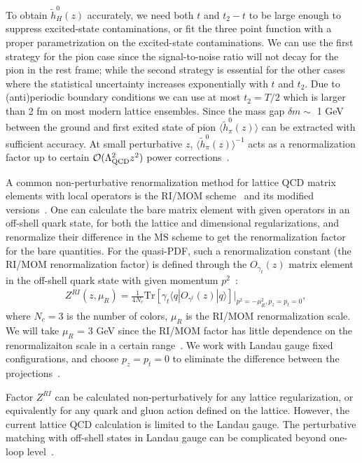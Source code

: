 To obtain $\tilde{h}^0_{H}(z)$ accurately, we need both $t$ and $t_2-t$ to be large enough to suppress excited-state contaminations, or fit the three point function with a proper parametrization on the excited-state contaminations. We can use the first strategy for the pion case since the signal-to-noise ratio will not decay for the pion in the rest frame; while the second strategy is essential for the other cases where the statistical uncertainty increases exponentially with $t$ and $t_2$. Due to (anti)periodic boundary conditions we can use at most $t_2=T/2$ which is larger than 2 fm on most modern lattice ensembles. Since the mass gap $\delta m\sim $ 1 GeV between the ground and first exited state of pion  $\langle \tilde{h}^0_{\pi}(z)\rangle$ can be extracted with sufficient  accuracy. At small perturbative $z$, $\langle \tilde{h}^0_{\pi}(z)\rangle^{-1}$ acts as a renormalization factor up to certain ${\cal O}(\Lambda_{\rm QCD}^2z^2)$ power corrections~\cite{Orginos:2017kos}.

A common non-perturbative renormalization method for lattice QCD matrix elements with local operators is the RI/MOM scheme~\cite{Martinelli:1994ty} and its modified versions~\cite{Aoki:2007xm}. One can calculate the bare matrix element with given operators in an off-shell quark state, for both the lattice and dimensional regularizations, and renormalize their difference in the $\overline{\textrm{MS}}$ scheme to get the renormalization factor for the bare quantities. For the quasi-PDF, such a renormalization constant (the RI/MOM renormalization factor) is defined through the $O_{\gamma_t}(z)$ matrix element in the off-shell quark state with given momentum $p^2$~\cite{Green:2017xeu,Chen:2017mzz,Alexandrou:2017huk,Stewart:2017tvs}:
\begin{align}\label{eq:Z_ri}
&Z^{RI}(z,\mu_R)=\frac{1}{4N_c}\textrm{Tr}[\gamma_t\langle q|O_{\gamma^t}(z)|q\rangle]|_{p^2=-\mu_R^2,p_z=p_t=0},
\end{align}
where $N_c=3$ is the number of colors, $\mu_R$ is the RI/MOM renormalization scale. We will take $\mu_R$ = 3 GeV since the RI/MOM factor has little dependence on the renormalizaiton scale in a certain range~\cite{Zhang:2020rsx}. We work with Landau gauge fixed configurations, and choose $p_z=p_t=0$ to eliminate the difference between the projections~\cite{Liu:2018uuj}. 

Factor $Z^{RI}$ can be calculated non-perturbatively for any lattice regularization, or equivalently for any quark and gluon action defined on the lattice. However, the current lattice QCD calculation is limited to the Landau gauge. The perturbative matching with off-shell states in Landau gauge can be complicated beyond one-loop level~\cite{Chen:2020ody}. 


